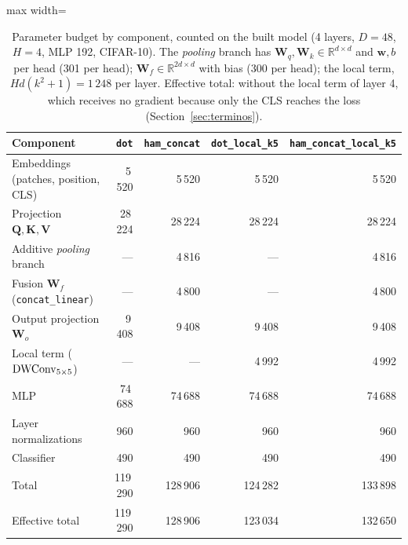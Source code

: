 
\begin{table}[!t]
\centering
\footnotesize
\caption{Parameter budget by component, counted on the built model (4 layers, $D=48$, $H=4$, MLP 192, CIFAR-10). The \emph{pooling} branch has $\mathbf{W}_q,\mathbf{W}_k\in\mathbb{R}^{d\times d}$ and $\mathbf{w},b$ per head (301 per head); $\mathbf{W}_f\in\mathbb{R}^{2d\times d}$ with bias (300 per head); the local term, $Hd(k^2+1)=1\,248$ per layer. Effective total: without the local term of layer 4, which receives no gradient because only the CLS reaches the loss (Section~\ref{sec:terminos}).}
\label{tab:parametros}
\begin{adjustbox}{max width=\linewidth}
\begin{tabular}{lrrrr}
\toprule
Component & \texttt{dot} & \texttt{ham\_concat} & \texttt{dot\_local\_k5} & \texttt{ham\_concat\_local\_k5} \\
\midrule
Embeddings (patches, position, CLS) & 5\,520 & 5\,520 & 5\,520 & 5\,520 \\
Projection $\mathbf{Q},\mathbf{K},\mathbf{V}$ & 28\,224 & 28\,224 & 28\,224 & 28\,224 \\
Additive \emph{pooling} branch & --- & 4\,816 & --- & 4\,816 \\
Fusion $\mathbf{W}_f$ (\texttt{concat\_linear}) & --- & 4\,800 & --- & 4\,800 \\
Output projection $\mathbf{W}_o$ & 9\,408 & 9\,408 & 9\,408 & 9\,408 \\
Local term ($\operatorname{DWConv}_{5\times5}$) & --- & --- & 4\,992 & 4\,992 \\
MLP & 74\,688 & 74\,688 & 74\,688 & 74\,688 \\
Layer normalizations & 960 & 960 & 960 & 960 \\
Classifier & 490 & 490 & 490 & 490 \\
\midrule
Total & 119\,290 & 128\,906 & 124\,282 & 133\,898 \\
Effective total & 119\,290 & 128\,906 & 123\,034 & 132\,650 \\
\bottomrule
\end{tabular}
\end{adjustbox}
\end{table}
